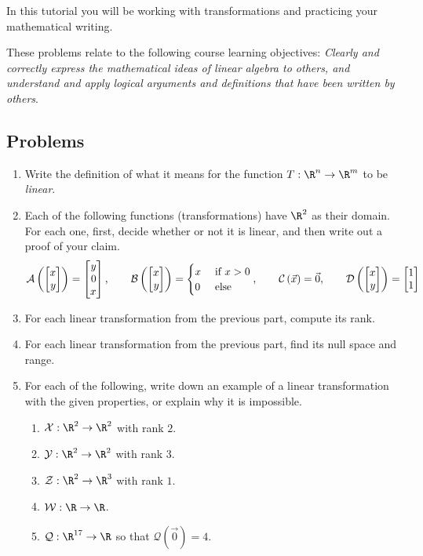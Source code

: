 		\begin{objectives}
	In this tutorial you will be working with transformations and practicing your
			mathematical writing.

	These problems relate to the following course learning objectives:
			\textit{Clearly and correctly express the mathematical ideas of linear algebra to others,
			and understand and apply logical arguments and definitions that have been written by others}.
		\end{objectives}


\subsection*{Problems}


\begin{enumerate}
	\item Write the definition of what it means for the function $T:\R^n\to\R^m$ to be \emph{linear}.

	\item Each of the following functions (transformations) have $\R^2$ as their domain.
		For each one, first, decide whether or not
		it is linear, and then write out a proof of your claim.
		\[
			\mathcal A\left(\mat{x\\y}\right) = \mat{y\\0\\x},\qquad
			\mathcal B\left(\mat{x\\y}\right) = \begin{cases}
								x &\text{ if } x>0\\
								0 &\text{ else}
								\end{cases},\qquad
			\mathcal C\left(\vec x\right) = \vec 0,\qquad
			\mathcal D\left(\mat{x\\y}\right) = \mat{1\\1}
		\]
	\item For each linear transformation from the previous part, compute its rank.
	\item For each linear transformation from the previous part, find its null space and range.
	\item For each of the following, write down an example of a linear transformation with the
		given properties, or explain why it is impossible.
		\begin{enumerate}
			\item $\mathcal X:\R^2\to\R^2$ with rank $2$.
			\item $\mathcal Y:\R^2\to\R^2$ with rank $3$.
			\item $\mathcal Z:\R^2\to\R^3$ with rank $1$.
			\item $\mathcal W:\R\to\R$.
			\item $\mathcal Q:\R^{17}\to\R$ so that $\mathcal Q(\vec 0)=4$.
		\end{enumerate}
\end{enumerate}